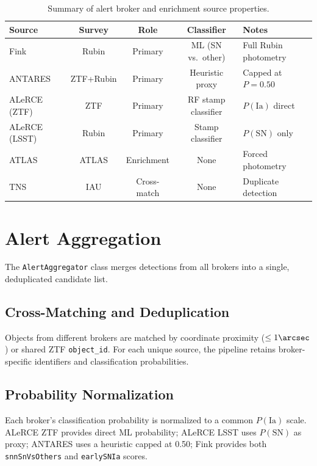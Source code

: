 \documentclass[11pt,letterpaper]{article}
\begin{document}
\begin{table}[h]
\centering
\caption{Summary of alert broker and enrichment source properties.}
\label{tab:brokers}
\begin{tabular}{lcccl}
\toprule
Source & Survey & Role & Classifier & Notes \\
\midrule
Fink          & Rubin   & Primary  & ML (SN vs.\ other) & Full Rubin photometry \\
ANTARES       & ZTF+Rubin & Primary & Heuristic proxy & Capped at $P=0.50$ \\
ALeRCE (ZTF)  & ZTF     & Primary  & RF stamp classifier & $P(\mathrm{Ia})$ direct \\
ALeRCE (LSST) & Rubin   & Primary  & Stamp classifier & $P(\mathrm{SN})$ only \\
ATLAS         & ATLAS   & Enrichment & None & Forced photometry \\
TNS           & IAU     & Cross-match & None & Duplicate detection \\
\bottomrule
\end{tabular}
\end{table}


\section{Alert Aggregation}
\label{sec:aggregation}

The \texttt{AlertAggregator} class merges detections from all brokers
into a single, deduplicated candidate list.

\subsection{Cross-Matching and Deduplication}

Objects from different brokers are matched by coordinate proximity
($\leq 1\arcsec$) or shared ZTF \texttt{object\_id}.  For each unique
source, the pipeline retains broker-specific identifiers and
classification probabilities.

\subsection{Probability Normalization}

Each broker's classification probability is normalized to a common
$P(\mathrm{Ia})$ scale.  ALeRCE ZTF provides direct ML probability;
ALeRCE LSST uses $P(\mathrm{SN})$ as proxy; ANTARES uses a heuristic
capped at 0.50; Fink provides both \texttt{snnSnVsOthers} and
\texttt{earlySNIa} scores.
\end{document}
